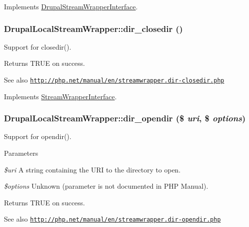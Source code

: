 Implements \hyperlink{interfaceDrupalStreamWrapperInterface_a1b1e5436bc2d310b1d340f389f7484b3}{DrupalStreamWrapperInterface}.\hypertarget{classDrupalLocalStreamWrapper_a6543951f671cd1a785f46b51be315423}{
\subsubsection[{dir\_\-closedir}]{\setlength{\rightskip}{0pt plus 5cm}DrupalLocalStreamWrapper::dir\_\-closedir ()}}
\label{classDrupalLocalStreamWrapper_a6543951f671cd1a785f46b51be315423}
Support for closedir().

\begin{DoxyReturn}{Returns}
TRUE on success.
\end{DoxyReturn}
\begin{DoxySeeAlso}{See also}
\href{http://php.net/manual/en/streamwrapper.dir-closedir.php}{\tt http://php.net/manual/en/streamwrapper.dir-\/closedir.php} 
\end{DoxySeeAlso}


Implements \hyperlink{interfaceStreamWrapperInterface}{StreamWrapperInterface}.\hypertarget{classDrupalLocalStreamWrapper_a5b80a0510f46a5da5ae6b3a9ecd01f6e}{
\subsubsection[{dir\_\-opendir}]{\setlength{\rightskip}{0pt plus 5cm}DrupalLocalStreamWrapper::dir\_\-opendir (\$ {\em uri}, \/  \$ {\em options})}}
\label{classDrupalLocalStreamWrapper_a5b80a0510f46a5da5ae6b3a9ecd01f6e}
Support for opendir().


\begin{DoxyParams}{Parameters}
\item[{\em \$uri}]A string containing the URI to the directory to open. \item[{\em \$options}]Unknown (parameter is not documented in PHP Manual).\end{DoxyParams}
\begin{DoxyReturn}{Returns}
TRUE on success.
\end{DoxyReturn}
\begin{DoxySeeAlso}{See also}
\href{http://php.net/manual/en/streamwrapper.dir-opendir.php}{\tt http://php.net/manual/en/streamwrapper.dir-\/opendir.php} 
\end{DoxySeeAlso}


